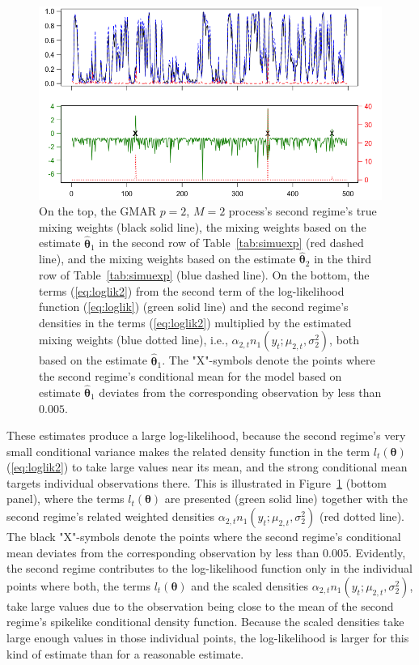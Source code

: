 \documentclass[nojss]{jss} %
\begin{document}
\begin{appendix}
\begin{figure}[p]
  \centering
  \includegraphics{figures/figsimuexp.png}
  \caption{On the top, the GMAR $p=2$, $M=2$ process's second regime's true mixing weights (black solid line), the mixing weights based on the estimate $\hat{\boldsymbol{\theta}}_1$ in the second row of Table~\ref{tab:simuexp} (red dashed line), and the mixing weights based on the estimate $\hat{\boldsymbol{\theta}}_2$ in the third row of Table~\ref{tab:simuexp} (blue dashed line). On the bottom, the terms (\ref{eq:loglik2}) from the second term of the log-likelihood function (\ref{eq:loglik}) (green solid line) and the second regime's densities in the terms (\ref{eq:loglik2}) multiplied by the estimated mixing weights (blue dotted line), i.e., $\alpha_{2,t}n_1(y_t;\mu_{2,t},\sigma_2^2)$, both based on the estimate $\hat{\boldsymbol{\theta}}_1$. The "X"-symbols denote the points where the second regime's conditional mean for the model based on estimate $\hat{\boldsymbol{\theta}}_1$ deviates from the corresponding observation by less than $0.005$.}
\label{fig:simuexp}
\end{figure}

These estimates produce a large log-likelihood, because the second regime's very small conditional variance makes the related density function in the term $l_t(\boldsymbol{\theta})$ (\ref{eq:loglik2}) to take large values near its mean, and the strong conditional mean targets individual observations there. This is illustrated in Figure~\ref{fig:simuexp} (bottom panel), where the terms $l_t(\boldsymbol{\theta})$ are presented (green solid line) together with the second regime's related weighted densities $\alpha_{2,t}n_1(y_t;\mu_{2,t},\sigma_2^2)$ (red dotted line). The black "X"-symbols denote the points where the second regime's conditional mean deviates from the corresponding observation by less than $0.005$. Evidently, the second regime contributes to the log-likelihood function only in the individual points where both, the terms $l_t(\boldsymbol{\theta})$ and the scaled densities $\alpha_{2,t}n_1(y_t;\mu_{2,t},\sigma_2^2)$, take large values due to the observation being close to the mean of the second regime's spikelike conditional density function. Because the scaled densities take large enough values in those individual points, the log-likelihood is larger for this kind of estimate than for a reasonable estimate.


\end{appendix}
\end{document}

